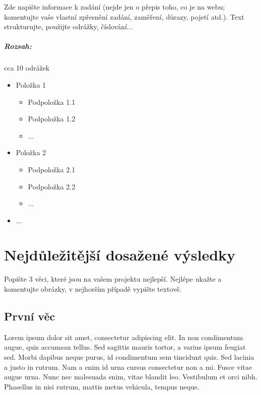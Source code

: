 \documentclass[12pt,a4paper,titlepage,final]{report}
\begin{document}
Zde napište informace k zadání (nejde jen o přepis toho, co je na webu;
komentujte vaše vlastní zpřesnění zadání, zaměření, důrazy, pojetí atd.). Text
strukturujte, použijte odrážky, číslování$\ldots$

\paragraph{Rozsah:} cca 10 odrážek

\begin{itemize}
	\item Položka 1
	\begin{itemize}
		\item Podpoložka 1.1
		\item Podpoložka 1.2
		\item $\ldots$
	\end{itemize}
	\item Položka 2
	\begin{itemize}
		\item Podpoložka 2.1
		\item Podpoložka 2.2
		\item $\ldots$
	\end{itemize}
	\item $\ldots$
\end{itemize}

\chapter{Nejdůležitější dosažené výsledky}

Popište 3 věci, které jsou na vašem projektu nejlepší. Nejlépe ukažte a
komentujte obrázky, v nejhorším případě vypište textově.

\section{První věc}

Lorem ipsum dolor sit amet, consectetur adipiscing elit. In non condimentum augue, quis accumsan tellus. Sed sagittis mauris tortor, a varius ipsum feugiat sed. Morbi dapibus neque purus, id condimentum sem tincidunt quis. Sed lacinia a justo in rutrum. Nam a enim id urna cursus consectetur non a mi. Fusce vitae augue urna. Nunc nec malesuada enim, vitae blandit leo. Vestibulum et orci nibh. Phasellus in nisi rutrum, mattis metus vehicula, tempus neque.
\end{document}
